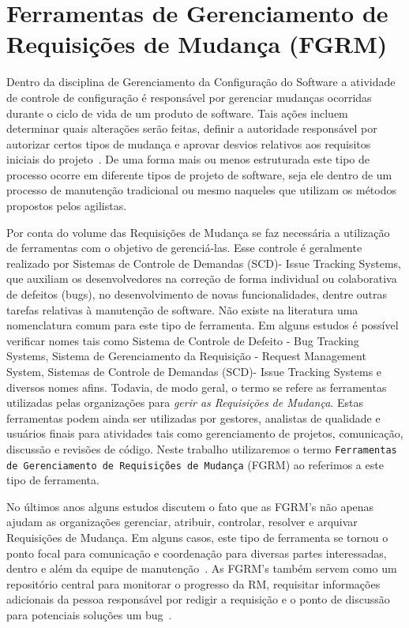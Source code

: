 \section{Ferramentas de Gerenciamento de Requisições de Mudança (FGRM)}
\label{sec:ferramentas_de_gerenciameto_de_requisições_de_mudança}

Dentro da disciplina de Gerenciamento da Configuração do Software a atividade
de controle de configuração é responsável por gerenciar mudanças ocorridas durante
o ciclo de vida de um produto de software. Tais ações incluem determinar
quais alterações serão feitas, definir a autoridade responsável por autorizar certos
tipos de mudança e aprovar desvios relativos aos requisitos iniciais
do projeto~\cite{4425813}. De uma forma mais ou menos estruturada este tipo de
processo ocorre em diferente tipos de projeto de software, seja ele dentro de um
processo de manutenção tradicional ou mesmo naqueles que utilizam os
métodos propostos pelos agilistas. 

Por conta do volume das Requisições de Mudança se faz necessária a utilização de ferramentas com o
objetivo de gerenciá-las. Esse controle é geralmente realizado por Sistemas de Controle de Demandas
(SCD)- Issue Tracking Systems, que auxiliam os desenvolvedores na correção de forma individual ou
colaborativa de defeitos (bugs), no desenvolvimento de novas funcionalidades, dentre outras tarefas
relativas à manutenção de software. Não existe na literatura uma nomenclatura comum para este tipo
de ferramenta. Em alguns estudos é possível verificar nomes tais como Sistema de Controle de Defeito
- Bug Tracking Systems, Sistema de Gerenciamento da Requisição - Request Management System, Sistemas
de Controle de Demandas (SCD)- Issue Tracking Systems e diversos nomes afins. Todavia, de modo
geral, o termo se refere as ferramentas utilizadas pelas organizações para
\textit{gerir as Requisições de Mudança}. Estas ferramentas podem ainda ser utilizadas por gestores, analistas de
qualidade e usuários finais para atividades tais como gerenciamento de projetos, comunicação,
discussão e revisões de código. Neste trabalho utilizaremos o termo \texttt{Ferramentas de Gerenciamento de Requisições de Mudança} (FGRM) ao referimos a este tipo de ferramenta.

No últimos anos alguns estudos discutem o fato que as FGRM's não apenas ajudam as organizações
gerenciar, atribuir, controlar, resolver e arquivar Requisições de Mudança. Em alguns casos, este
tipo de ferramenta se tornou o ponto focal para comunicação e coordenação para diversas
partes interessadas, dentro e além da equipe de manutenção~\cite{Bertram:2010:CCB:1718918.1718972}.
As FGRM's também servem como um repositório central para monitorar o progresso da RM, requisitar
informações adicionais da pessoa responsável por redigir a requisição e o ponto de discussão para
potenciais soluções um bug~\cite{zimmermann2009improving}.

